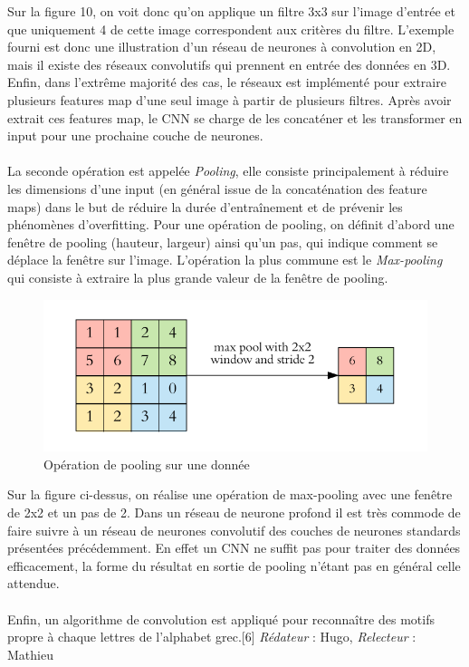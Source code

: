 \documentclass[oneside,a4paper,13pt]{article}
\begin{document}
Sur la figure 10, on voit donc qu'on applique un filtre 3x3 sur l'image d'entrée et que uniquement 4 de cette image correspondent aux critères du filtre. L'exemple fourni est donc une illustration d'un réseau de neurones à convolution en 2D, mais il existe des réseaux convolutifs qui prennent en entrée des données en 3D.\\
Enfin, dans l'extrême majorité des cas, le réseaux est implémenté pour extraire plusieurs features map d'une seul image à partir de plusieurs filtres. Après avoir extrait ces features map, le CNN se charge de les concaténer et les transformer en input pour une prochaine couche de neurones.\\ \\
La seconde opération est appelée \emph{Pooling}, elle consiste principalement à réduire les dimensions d'une input (en général issue de la concaténation des feature maps) dans le but de réduire la durée d'entraînement et de prévenir les phénomènes d'overfitting. Pour une opération de pooling, on définit d'abord une fenêtre de pooling (hauteur, largeur) ainsi qu'un pas, qui indique comment se déplace la fenêtre sur l'image. L'opération la plus commune est le \emph{Max-pooling} qui consiste à extraire la plus grande valeur de la fenêtre de pooling.
\begin{figure}[H]
    \centering
        \includegraphics[width=0.8\linewidth]{Images/pooling.PNG}
        \caption{Opération de pooling sur une donnée}
        \label{fig:my_label}
\end{figure}
Sur la figure ci-dessus, on réalise une opération de max-pooling avec une fenêtre de 2x2 et un pas de 2.
Dans un réseau de neurone profond il est très commode de faire suivre à un réseau de neurones convolutif des couches de neurones standards présentées précédemment. En effet un CNN ne suffit pas pour traiter des données efficacement, la forme du résultat en sortie de pooling n'étant pas en général celle attendue.\\ \\
Enfin, un algorithme de convolution est appliqué pour reconnaître des motifs propre à chaque lettres de l'alphabet grec.[6]
\smallbreak\textit{Rédateur} : Hugo, \textit{Relecteur} : Mathieu
\end{document}
